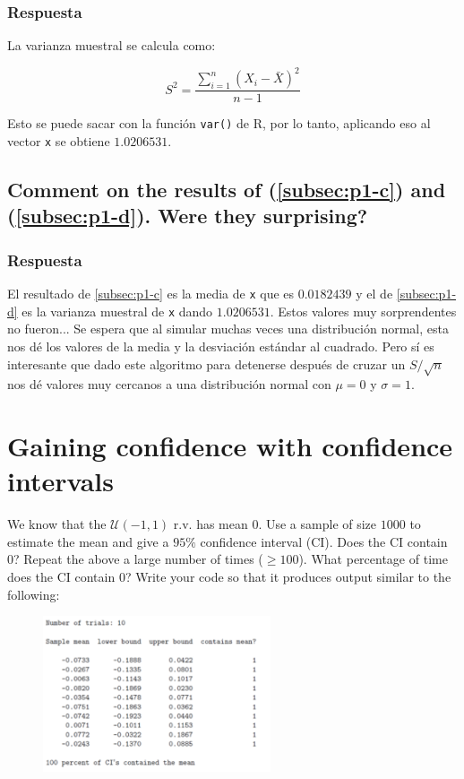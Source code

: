 \documentclass[12pt]{article}\usepackage[]{graphicx}\usepackage[]{xcolor}
\begin{document}
\subsubsection{Respuesta}

La varianza muestral se calcula como:

\[
S^{2} = \frac{\sum_{i=1}^{n} (X_{i} - \bar{X})^{2}}{n-1}
\]

Esto se puede sacar con la función \lstinline|var()| de \textsf{R}, por lo tanto, aplicando eso al vector \lstinline|x| se obtiene $1.0206531$.



\subsection{Comment on the results of (\ref{subsec:p1-c}) and (\ref{subsec:p1-d}). Were they surprising?}
\label{subsec:p1-e}

\subsubsection{Respuesta}

El resultado de \ref{subsec:p1-c} es la media de \lstinline|x| que es $0.0182439$ y el de \ref{subsec:p1-d} es la varianza muestral de \lstinline|x| dando $1.0206531$. Estos valores muy sorprendentes no fueron... Se espera que al simular muchas veces una distribución normal, esta nos dé los valores de la media y la desviación estándar al cuadrado. Pero sí es interesante que dado este algoritmo para detenerse después de cruzar un $S / \sqrt{n}$ nos dé valores muy cercanos a una distribución normal con $\mu = 0$ y $\sigma = 1$.


\newpage

\section{Gaining confidence with confidence intervals}

We know that the $\mathcal{U}(-1, 1)$ r.v. has mean 0. Use a sample of size $1000$ to estimate the mean and give a $95\%$ confidence interval (CI). Does the CI contain 0? Repeat the above a large number of times ($\geq  100$). What percentage of time does the CI contain 0? Write your code so that it produces output similar to the following:

\begin{figure}[ht]
  \centering
  \includegraphics[width=0.6\textwidth]{img/Punto2.png}
\end{figure}
\end{document}
